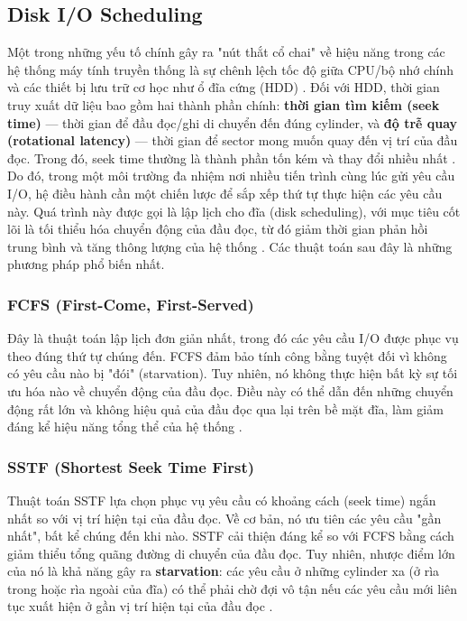 \documentclass[12pt]{article}
\begin{document}
\subsection{Disk I/O Scheduling}

Một trong những yếu tố chính gây ra "nút thắt cổ chai" về hiệu năng trong các hệ thống máy tính truyền thống là sự chênh lệch tốc độ giữa CPU/bộ nhớ chính và các thiết bị lưu trữ cơ học như ổ đĩa cứng (HDD) \parencite{Pokharel2021}. Đối với HDD, thời gian truy xuất dữ liệu bao gồm hai thành phần chính: \textbf{thời gian tìm kiếm (seek time)} --- thời gian để đầu đọc/ghi di chuyển đến đúng cylinder, và \textbf{độ trễ quay (rotational latency)} --- thời gian để sector mong muốn quay đến vị trí của đầu đọc. Trong đó, seek time thường là thành phần tốn kém và thay đổi nhiều nhất \parencite{KansalDiskScheduling}. Do đó, trong một môi trường đa nhiệm nơi nhiều tiến trình cùng lúc gửi yêu cầu I/O, hệ điều hành cần một chiến lược để sắp xếp thứ tự thực hiện các yêu cầu này. Quá trình này được gọi là lập lịch cho đĩa (disk scheduling), với mục tiêu cốt lõi là tối thiểu hóa chuyển động của đầu đọc, từ đó giảm thời gian phản hồi trung bình và tăng thông lượng của hệ thống \parencite{GeeksForGeeks2025IO}. Các thuật toán sau đây là những phương pháp phổ biến nhất.

\subsubsection{FCFS (First-Come, First-Served)}
Đây là thuật toán lập lịch đơn giản nhất, trong đó các yêu cầu I/O được phục vụ theo đúng thứ tự chúng đến. FCFS đảm bảo tính công bằng tuyệt đối vì không có yêu cầu nào bị "đói" (starvation). Tuy nhiên, nó không thực hiện bất kỳ sự tối ưu hóa nào về chuyển động của đầu đọc. Điều này có thể dẫn đến những chuyển động rất lớn và không hiệu quả của đầu đọc qua lại trên bề mặt đĩa, làm giảm đáng kể hiệu năng tổng thể của hệ thống \parencite{GeeksForGeeks2025IO}.

\subsubsection{SSTF (Shortest Seek Time First)}
Thuật toán SSTF lựa chọn phục vụ yêu cầu có khoảng cách (seek time) ngắn nhất so với vị trí hiện tại của đầu đọc. Về cơ bản, nó ưu tiên các yêu cầu "gần nhất", bất kể chúng đến khi nào. SSTF cải thiện đáng kể so với FCFS bằng cách giảm thiểu tổng quãng đường di chuyển của đầu đọc. Tuy nhiên, nhược điểm lớn của nó là khả năng gây ra \textbf{starvation}: các yêu cầu ở những cylinder xa (ở rìa trong hoặc rìa ngoài của đĩa) có thể phải chờ đợi vô tận nếu các yêu cầu mới liên tục xuất hiện ở gần vị trí hiện tại của đầu đọc \parencite{GeeksForGeeks2025IO, KansalDiskScheduling}.
\end{document}

